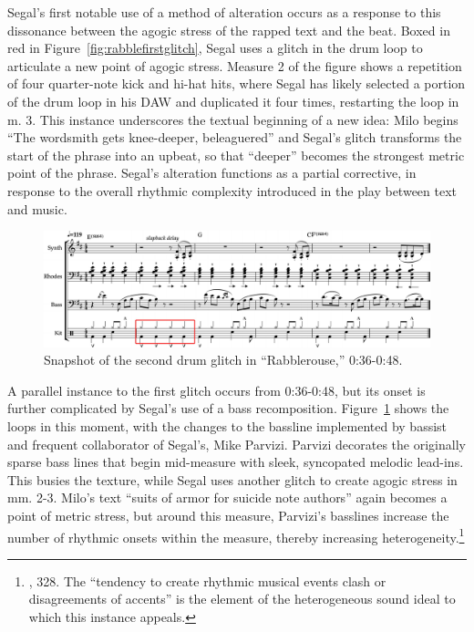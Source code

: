 Segal's first notable use of a method of alteration occurs as a response to this dissonance between
the agogic stress of the rapped text and the beat. Boxed in red in Figure~\ref{fig:rabblefirstglitch}, 
Segal uses a glitch in the drum loop to articulate a new point of agogic stress. Measure 2 of the 
figure shows a repetition of four quarter-note kick and hi-hat hits, where Segal has likely selected 
a portion of the drum loop in his DAW and duplicated it four times, restarting the loop in m. 3. This
instance underscores the textual beginning of a new idea: Milo begins ``The wordsmith gets knee-deeper,
beleaguered'' and Segal's glitch transforms the start of the phrase into an upbeat, so that ``deeper''
becomes the strongest metric point of the phrase. Segal's alteration functions as a partial corrective, 
in response to the overall rhythmic complexity introduced in the play between text and music.

    \begin{figure}[ht]
        \centering
        \includegraphics[width=\textwidth]{images/figures/chp 02/036048rabblesecondglitch.pdf}
        \caption{Snapshot of the second drum glitch in ``Rabblerouse,'' 0:36-0:48.}
        \label{fig:rabblesecondglitch}
    \end{figure}

A parallel instance to the first glitch occurs from 0:36-0:48, but its onset is further complicated
by Segal's use of a bass recomposition. Figure~\ref{fig:rabblesecondglitch} shows the loops in this 
moment, with the changes to the bassline implemented by bassist and frequent collaborator of Segal's, 
Mike Parvizi. Parvizi decorates the originally sparse bass lines that begin mid-measure with sleek,
syncopated melodic lead-ins. This busies the texture, while Segal uses another glitch to create agogic 
stress in mm. 2-3. Milo's text \textemdash  ``suits of armor for suicide note authors'' \textemdash again
becomes a point of metric stress, but around this measure, Parvizi's basslines increase the number of
rhythmic onsets within the measure, thereby increasing 
heterogeneity.\footnote{\cite{ollywilsonHeterogeneousSoundIdeal1992}, 328. The ``tendency to create 
rhythmic musical events clash or disagreements of accents'' is the element of the heterogeneous sound 
ideal to which this instance appeals.}

